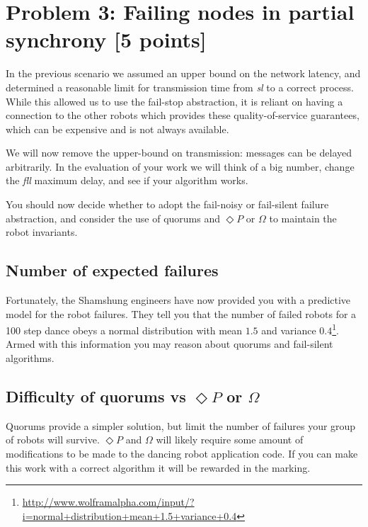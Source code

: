 \documentclass[a4paper]{article}
\begin{document}
\section*{Problem 3: Failing nodes in partial synchrony [5 points]} %
\label{sec:problem_3_partial_synchrony}

In the previous scenario we assumed an upper bound on the network latency, and
determined a reasonable limit for transmission time from \emph{sl} to a
correct process. While this allowed us to use the fail-stop abstraction, it is
reliant on having a connection to the other robots which provides these
quality-of-service guarantees, which can be expensive and is not always
available.

We will now remove the upper-bound on transmission: messages can be delayed
arbitrarily. In the evaluation of your work we will think of a big number,
change the \emph{fll} maximum delay, and see if your algorithm works.

You should now decide whether to adopt the fail-noisy or fail-silent failure
abstraction, and consider the use of quorums and $\Diamond P$ or $\Omega$ to
maintain the robot invariants.

\subsection*{Number of expected failures} %
\label{sub:number_of_expected_failures}

Fortunately, the Shamshung engineers have now provided you with a predictive
model for the robot failures. They tell you that the number of failed robots
for a 100 step dance obeys a normal distribution with mean $1.5$ and variance
$0.4$\footnote{\url{http://www.wolframalpha.com/input/?i=normal+distribution+mean+1.5+variance+0.4}}.
Armed with this information you may reason about quorums and fail-silent
algorithms.



\subsection*{Difficulty of quorums vs $\Diamond P$ or $\Omega$} %
\label{sub:difficulty_of_quorums_vs_diamond_p_}

Quorums provide a simpler solution, but limit the number of failures your
group of robots will survive. $\Diamond P$ and $\Omega$ will likely require
some amount of modifications to be made to the dancing robot application code.
If you can make this work with a correct algorithm it will be rewarded in the
marking.
\end{document}
